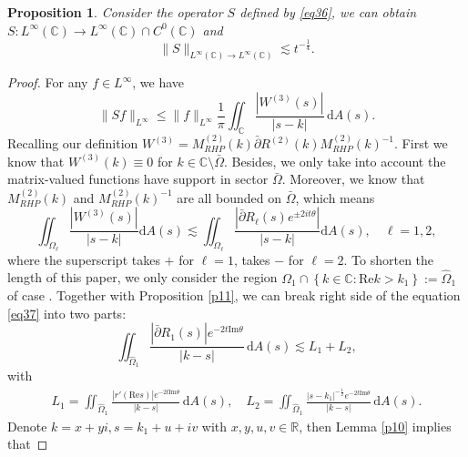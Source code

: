 \documentclass[11pt]{article}
\numberwithin{equation}{section}
\newtheorem{Proposition}{Proposition}
\begin{document}
\begin{Proposition}\label{p17}
    Consider the operator $S$ defined by \eqref{eq36},  we can obtain $S : L^\infty(\mathbb{C}) \to L^\infty(\mathbb{C}) \cap C^0(\mathbb{C})$ and
\begin{equation}
    \|S\|_{L^\infty(\mathbb{C}) \to L^\infty(\mathbb{C})} \lesssim t^{-\frac{1}{4}}.
\end{equation}

\end{Proposition}

\begin{proof}
    For any $f \in L^\infty$, we have
\begin{equation*}
    \|Sf\|_{L^\infty} \leq \|f\|_{L^\infty} \frac{1}{\pi} \iint_\mathbb{C} \frac{|W^{(3)}(s)|}{|s - k|} \, \mathrm{d}A(s).
\end{equation*}
Recalling our definition $W^{(3)} =  M_{RHP}^{(2)}(k) \bar{\partial} R^{(2)}(k) M_{RHP}^{(2)}(k)^{-1}.$ First we know that $W^{(3)}(k) \equiv 0$ for $k \in \mathbb{C} \setminus \bar{\Omega}$. Besides, we only take into account the matrix-valued functions have support in sector $\bar{\Omega}$. Moreover, we know that $M_{RHP}^{(2)}(k)$ and $M_{RHP}^{(2)}(k)^{-1}$ are all bounded on $\bar{\Omega}$, which means
\begin{equation}\label{eq37}
    \iint_{\Omega_\ell}\frac{|W^{(3)}(s)|}{|s-k|}\mathrm{d}A(s)\lesssim\iint_{\Omega_\ell}\frac{|\bar{\partial}R_\ell(s)e^{\pm2it\theta}|}{|s-k|}\mathrm{d}A(s),\quad\ell=1,2,
\end{equation}
where the superscript takes $+$ for $\ell=1$, takes $-$ for $\ell=2$.
To shorten the length of this paper, we only consider the region $\Omega_1\cap\left\{k\in\mathbb{C}:\mathrm{Re}k>k_1\right\}:=\widehat\Omega_1$ of case \uppercase\expandafter{}. Together with Proposition \ref{p11}, we can break right side of the equation \eqref{eq37} into two parts:
\begin{equation*}
\iint_{\widehat\Omega_1} \frac{|\bar{\partial} R_{1}(s)| e^{-2t \mathrm{Im} \theta}}{|k - s|} \, \mathrm{d}A(s)
\lesssim L_1 + L_2,
\end{equation*}
with
\begin{align*}
    L_1 = \iint_{\widehat\Omega_1} \frac{|r'(\mathrm{Re}s)| e^{-2t \mathrm{Im} \theta}}{|k - s|} \, \mathrm{d}A(s),\quad L_2 = \iint_{\widehat\Omega_1} \frac{|s - k_1|^{-\frac{1}{2}} e^{-2t \mathrm{Im} \theta}}{|k - s|} \, \mathrm{d}A(s).
\end{align*}
Denote $k=x+yi,s=k_1+u+iv$ with $x,y,u,v\in\mathbb{R}$, then Lemma \ref{p10} implies that

\end{proof}
\end{document}
